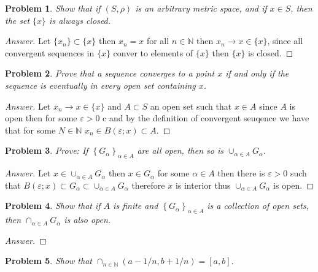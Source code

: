 \documentclass{article}
\newtheorem{problem}{Problem}[section]
\begin{document}
\begin{problem}
Show that if $(S, \rho)$ is an arbitrary metric space, and if $x \in S$, then the set $\{x\}$ is always closed.
\end{problem}

\begin{proof}[Answer]
    Let $\{x_n\}\subset \{x\}$ then $x_n = x$ for all $n\in \mathbb{N}$ then $x_n\to x\in \{x\}$, since all convergent sequences in $\{ x\}$ conver to elements of $\{ x\}$ then $\{ x\}$ is closed.
\end{proof}

\begin{problem}
Prove that a sequence converges to a point $x$ if and only if the sequence is eventually in every open set containing $x$.
\end{problem}

\begin{proof}[Answer]
    Let $x_n\to x\in \{x\}$ and $A\subset S$ an open set such that $x\in A$ since $A$ is open then for some $\varepsilon>0$ c and by the definition of convergent seuqence we have that for some $N\in \mathbb{N}$ $x_n\in B(\varepsilon;x)\subset A$.
\end{proof}

\begin{problem}
Prove: If $\left\{G_{\alpha}\right\}_{\alpha \in A}$ are all open, then so is $\cup_{\alpha \in A} G_{\alpha}$.
\end{problem}

\begin{proof}[Answer]
    Let $x\in \cup_{\alpha \in A} G_{\alpha}$ then $x\in G_\alpha$ for some $\alpha \in A$ then there is $\varepsilon >0 $ such that $B(\varepsilon; x)\subset G_\alpha \subset \cup_{\alpha \in A} G_{\alpha}$ therefore $x$ is interior thus $\cup_{\alpha \in A} G_{\alpha}$ is open.
\end{proof}

\begin{problem}
Show that if $A$ is finite and $\left\{G_{\alpha}\right\}_{\alpha \in A}$ is a collection of open sets, then $\cap_{\alpha \in A} G_{\alpha}$ is also open.
\end{problem}

\begin{proof}[Answer]
    
\end{proof}

\begin{problem}
Show that $\cap_{n \in \mathbb{N}}(a-1 / n, b+1 / n)=[a, b]$.
\end{problem}
\end{document}
